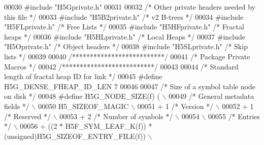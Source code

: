 \begin{DoxyCode}
00030 \textcolor{preprocessor}{#include "H5Gprivate.h"}
00031 
00032 \textcolor{comment}{/* Other private headers needed by this file */}
00033 \textcolor{preprocessor}{#include "H5B2private.h"}    \textcolor{comment}{/* v2 B-trees               */}
00034 \textcolor{preprocessor}{#include "H5FLprivate.h"}    \textcolor{comment}{/* Free Lists                           */}
00035 \textcolor{preprocessor}{#include "H5HFprivate.h"}    \textcolor{comment}{/* Fractal heaps            */}
00036 \textcolor{preprocessor}{#include "H5HLprivate.h"}    \textcolor{comment}{/* Local Heaps              */}
00037 \textcolor{preprocessor}{#include "H5Oprivate.h"}     \textcolor{comment}{/* Object headers           */}
00038 \textcolor{preprocessor}{#include "H5SLprivate.h"}    \textcolor{comment}{/* Skip lists               */}
00039 
00040 \textcolor{comment}{/**************************/}
00041 \textcolor{comment}{/* Package Private Macros */}
00042 \textcolor{comment}{/**************************/}
00043 
00044 \textcolor{comment}{/* Standard length of fractal heap ID for link */}
00045 \textcolor{preprocessor}{#define H5G\_DENSE\_FHEAP\_ID\_LEN  7}
00046 
00047 \textcolor{comment}{/* Size of a symbol table node on disk */}
00048 \textcolor{preprocessor}{#define H5G\_NODE\_SIZE(f)     (                                                \(\backslash\)}
00049 \textcolor{preprocessor}{    }\textcolor{comment}{/* General metadata fields */}\textcolor{preprocessor}{                                             \(\backslash\)}
00050 \textcolor{preprocessor}{    H5\_SIZEOF\_MAGIC                                                           \(\backslash\)}
00051 \textcolor{preprocessor}{    + 1         }\textcolor{comment}{/* Version */}\textcolor{preprocessor}{                                                 \(\backslash\)}
00052 \textcolor{preprocessor}{    + 1         }\textcolor{comment}{/* Reserved */}\textcolor{preprocessor}{                                                \(\backslash\)}
00053 \textcolor{preprocessor}{    + 2         }\textcolor{comment}{/* Number of symbols */}\textcolor{preprocessor}{                                       \(\backslash\)}
00054 \textcolor{preprocessor}{                                                                              \(\backslash\)}
00055 \textcolor{preprocessor}{    }\textcolor{comment}{/* Entries */}\textcolor{preprocessor}{                                                             \(\backslash\)}
00056 \textcolor{preprocessor}{    + ((2 * H5F\_SYM\_LEAF\_K(f)) * (unsigned)H5G\_SIZEOF\_ENTRY\_FILE(f))                    \(\backslash\)}

\end{DoxyCode}
